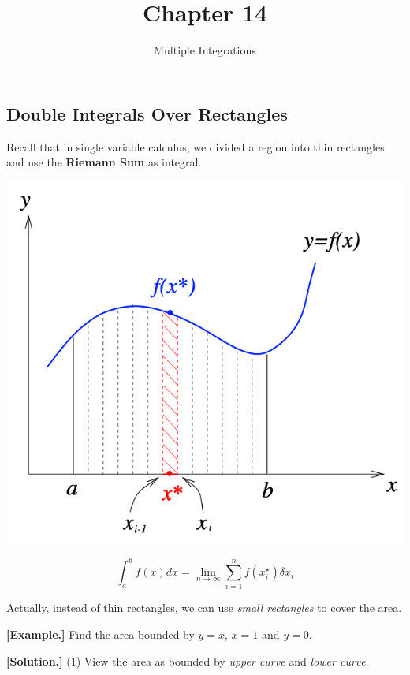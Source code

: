 \documentclass[11pt, a4paper]{MATH2023}
\title{Chapter 14}
\subtitle{Multiple Integrations}
\newcommand{\eg}{\textbf{[Example.] }}
\newcommand{\sol}{\textbf{[Solution.] }}
\begin{document}
\begin{spacing}{1.3}

    \section{Double Integrals Over Rectangles}

    Recall that in single variable calculus, we divided a region into 
    thin rectangles and use the {\bf Riemann Sum} as integral.
    \begin{center}
        \includegraphics[scale=0.35]{images/Ch14-intro.png}
    \end{center}
    $$\int_a^b f(x)dx=\lim_{n\rightarrow \infty}\sum_{i=1}^n f(x_i^\star)\delta x_i$$
    
    Actually, instead of thin rectangles, we can use {\it small rectangles} to cover the area.

    \eg Find the area bounded by $y=x$, $x=1$ and $y=0$.

    \sol (1) View the area as bounded by {\it upper curve} and {\it lower curve}.
    

    \begin{center}
        \begin{tikzpicture}[x=0.75pt,y=0.75pt,yscale=-1,xscale=1]
        

\end{tikzpicture}
\end{center}
\end{spacing}
\end{document}
